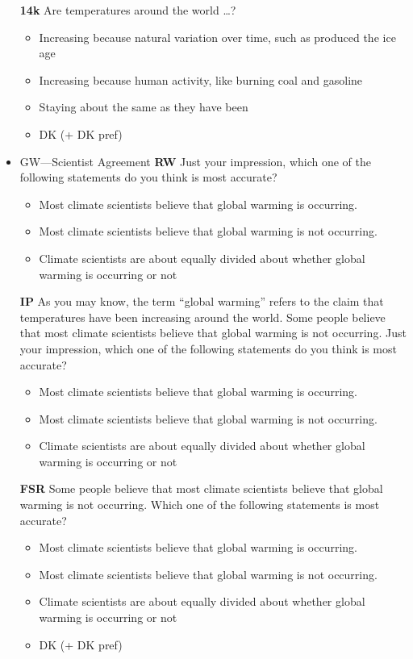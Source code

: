 \begin{itemize}
	\textbf{14k}\newline
	Are temperatures around the world \ldots?
	\begin{itemize}
		\item Increasing because natural variation over time, such as produced the ice age
		\item Increasing because human activity, like burning coal and gasoline
		\item Staying about the same as they have been
		\item DK (+ DK pref)
	\end{itemize}
	
	\item GW—Scientist Agreement\newline
	\textbf{RW}\newline
	Just your impression, which one of the following statements do you think is most
	accurate?
	\begin{itemize}
		\item Most climate scientists believe that global warming is occurring.
		\item Most climate scientists believe that global warming is not occurring.
		\item Climate scientists are about equally divided about whether global warming is occurring or not
	\end{itemize}
	
	\textbf{IP}\newline
	As you may know, the term ``global warming'' refers to the claim that temperatures
	have been increasing around the world. Some people believe that most climate
	scientists believe that global warming is not occurring. Just your impression, which
	one of the following statements do you think is most accurate?
	\begin{itemize}
		\item Most climate scientists believe that global warming is occurring.
		\item Most climate scientists believe that global warming is not occurring.
		\item Climate scientists are about equally divided about whether global warming is occurring or not
	\end{itemize}
	\textbf{FSR}\newline
	Some people believe that most climate scientists believe that global warming is not
	occurring. Which one of the following statements is most accurate?
	\begin{itemize}
		\item Most climate scientists believe that global warming is occurring.
		\item Most climate scientists believe that global warming is not occurring.
		\item Climate scientists are about equally divided about whether global warming is occurring or not
		\item DK (+ DK pref)
	\end{itemize}
	

\end{itemize}
